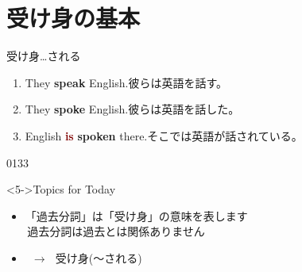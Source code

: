 \documentclass[aspectratio=169,xcolor={dvipsnames,table}]{beamer}
\newcommand{\myaudio}[1]{\href{#1}{\faVolumeUp}}
\begin{document}
\section{受け身の基本}
\begin{frame}[plain]{受け身\hspace{20pt}\ldots される}
 \large
\begin{enumerate}
 \item<1-> They \textbf{speak} English.\hfill{}{\scriptsize 彼らは英語を話す。}
 \item<2-> They \textbf{spoke} English.\hfill{\scriptsize 彼らは英語を話した。}
 \item<3-> English \textcolor{Maroon}{\bfseries is} \textcolor{NavyBlue}{\bfseries spoken} there.\hfill{\scriptsize そこでは英語が話されている。}
\end{enumerate}

\begin{center}
 
\end{center}


\hfill{\tiny 0133}\,{\scriptsize \myaudio{./audio/051_passive_01.mp3}}
\begin{block}<5->{Topics for Today}
\begin{itemize}[square]\small
 \item 「過去分詞」は「受け身」の意味を表します\\
\hfill{\textdbend\,過去分詞は過去とは関係ありません}\scalebox{2}{😭}
 \item {}\, $\longrightarrow$\,\,\,\,受け身(〜される)
\end{itemize}
     \end{block}
\end{frame}
\end{document}
